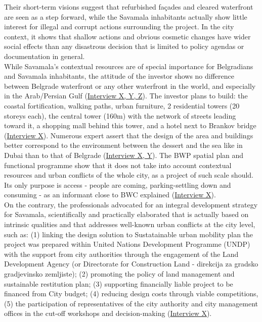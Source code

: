 \documentclass[11pt]{report}
\begin{document}
Their short-term visions suggest that refurbished façades and cleared waterfront are seen as a step forward, while the Savamala inhabitants actually show little interest for illegal and corrupt actions surrounding the project.
In the city context, it shows that shallow actions and obvious cosmetic changes have wider social effects than any disastrous decision that is limited to policy agendas or documentation in general.
\\

While Savamala's contextual resources are of special importance for Belgradians and Savamala inhabitants, the attitude of the investor shows no difference between Belgrade waterfront or any other waterfront in the world, and especially in the Arab/Persian Gulf
(\href{InterviewX}{Interview X, Y, Z}).
The investor plans to build: the coastal fortification, walking paths, urban furniture, 2 residential towers (20 storeys each), the central tower (160m) with the network of streets leading toward it, a shopping mall behind this tower, and a hotel next to Brankov bridge (\href{InterviewX}{Interview X}).
Numerous expert assert that the design of the area and buildings better correspond to the environment between the dessert and the sea like in Dubai than to that of Belgrade
(\href{InterviewX}{Interview X, Y}).
The BWP spatial plan and functional programme show that it does not take into account contextual resources and urban conflicts of the whole city, as  a project of such scale should.
Its only purpose is access - people are coming, parking-settling down and consuming - as an informant close to BWC explained
(\href{InterviewX}{Interview X}).
\\

On the contrary, the professionals advocated for an integral development strategy for Savamala, scientifically and practically elaborated that is actually based on intrinsic qualities and that addresses well-known urban conflicts at the city level, such as:
(1) linking the design solution to Sustatainable urban mobility plan {the project was prepared within United Nations Development Programme (UNDP) with the support from city authorities through the engagement of the Land Development Agency (or Directorate for Construction Land - direkcija za gradsko gradjevinsko zemljiste)};
(2) promoting the policy of land management and sustainable restitution plan;
(3) supporting financially liable project to be financed from City budget;
(4) reducing design costs through viable competitions,
(5) the participation of representatives of the city authority and city management offices in the cut-off workshops and decision-making
(\href{InterviewX}{Interview X}).
\\
\end{document}
